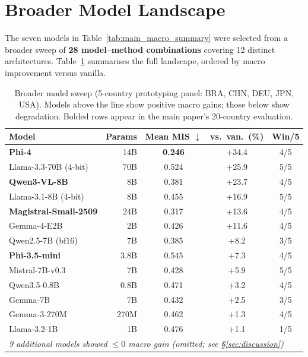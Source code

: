 \documentclass{article}
\providecommand{\gain}{}\renewcommand{\gain}[1]{\textcolor{improvegreen}{#1}}
\begin{document}
\section{Broader Model Landscape}
\label{app:model_landscape}

The seven models in Table~\ref{tab:main_macro_summary} were selected from a broader sweep of \textbf{28 model--method combinations} covering 12 distinct architectures.
Table~\ref{tab:model_landscape} summarises the full landscape, ordered by macro improvement versus vanilla.

\begin{table}[H]\centering\scriptsize
\caption{Broader model sweep (5-country prototyping panel: BRA, CHN, DEU, JPN, USA). Models above the line show positive macro gains; those below show degradation. Bolded rows appear in the main paper's 20-country evaluation.}
\label{tab:model_landscape}
\setlength{\tabcolsep}{3pt}
\begin{tabular}{lrccc}\toprule
Model & Params & Mean MIS $\downarrow$ & vs.\ van.\ (\%) & Win/5 \\\midrule
\textbf{Phi-4} & 14B & \textbf{0.246} & \gain{+34.4} & 4/5 \\
Llama-3.3-70B (4-bit) & 70B & 0.524 & \gain{+25.9} & 5/5 \\
\textbf{Qwen3-VL-8B} & 8B & 0.381 & \gain{+23.7} & 4/5 \\
Llama-3.1-8B (4-bit) & 8B & 0.455 & \gain{+16.9} & 5/5 \\
\textbf{Magistral-Small-2509} & 24B & 0.317 & \gain{+13.6} & 4/5 \\
Gemma-4-E2B & 2B & 0.426 & \gain{+11.6} & 4/5 \\
Qwen2.5-7B (bf16) & 7B & 0.385 & \gain{+8.2} & 3/5 \\
\textbf{Phi-3.5-mini} & 3.8B & 0.545 & \gain{+7.3} & 4/5 \\
Mistral-7B-v0.3 & 7B & 0.428 & \gain{+5.9} & 5/5 \\
Qwen3.5-0.8B & 0.8B & 0.471 & \gain{+3.2} & 4/5 \\
Gemma-7B & 7B & 0.432 & \gain{+2.5} & 3/5 \\
Gemma-3-270M & 270M & 0.462 & \gain{+1.3} & 4/5 \\
Llama-3.2-1B & 1B & 0.476 & \gain{+1.1} & 1/5 \\
\midrule
\multicolumn{5}{l}{\emph{9 additional models showed $\leq 0$ macro gain (omitted; see \S\ref{sec:discussion})}} \\
\bottomrule
\end{tabular}
\end{table}
\end{document}
